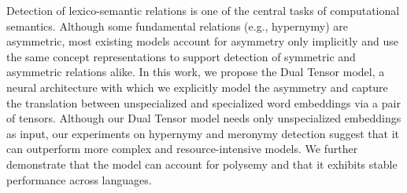 Detection of lexico-semantic relations is one of the central tasks of computational semantics. Although some fundamental relations (e.g., hypernymy) are asymmetric, most existing models account for asymmetry only implicitly and use the same concept representations to support detection of symmetric and asymmetric relations alike. In this work, we propose the Dual Tensor model, a neural architecture with which we explicitly model the asymmetry and capture the translation between unspecialized and specialized word embeddings via a pair of tensors. Although our Dual Tensor model needs only unspecialized embeddings as input, our experiments on hypernymy and meronymy detection suggest that it can outperform more complex and resource-intensive models. We further demonstrate that the model can account for polysemy and that it exhibits stable performance across languages.
